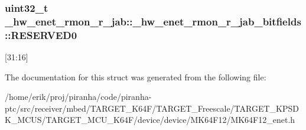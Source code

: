 \subsubsection[{\texorpdfstring{R\+E\+S\+E\+R\+V\+E\+D0}{RESERVED0}}]{\setlength{\rightskip}{0pt plus 5cm}uint32\+\_\+t \+\_\+hw\+\_\+enet\+\_\+rmon\+\_\+r\+\_\+jab\+::\+\_\+hw\+\_\+enet\+\_\+rmon\+\_\+r\+\_\+jab\+\_\+bitfields\+::\+R\+E\+S\+E\+R\+V\+E\+D0}\hypertarget{struct__hw__enet__rmon__r__jab_1_1__hw__enet__rmon__r__jab__bitfields_ae9f9081999a2c9be1174b2e24809b315}{}\label{struct__hw__enet__rmon__r__jab_1_1__hw__enet__rmon__r__jab__bitfields_ae9f9081999a2c9be1174b2e24809b315}
\mbox{[}31\+:16\mbox{]} 

The documentation for this struct was generated from the following file\+:\begin{DoxyCompactItemize}
\item 
/home/erik/proj/piranha/code/piranha-\/ptc/src/receiver/mbed/\+T\+A\+R\+G\+E\+T\+\_\+\+K64\+F/\+T\+A\+R\+G\+E\+T\+\_\+\+Freescale/\+T\+A\+R\+G\+E\+T\+\_\+\+K\+P\+S\+D\+K\+\_\+\+M\+C\+U\+S/\+T\+A\+R\+G\+E\+T\+\_\+\+M\+C\+U\+\_\+\+K64\+F/device/device/\+M\+K64\+F12/M\+K64\+F12\+\_\+enet.\+h\end{DoxyCompactItemize}
